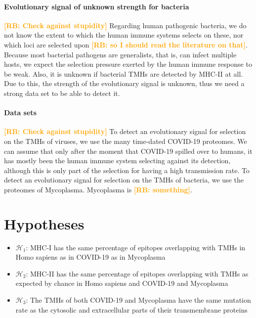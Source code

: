 \documentclass{article}
\newcommand{\richel}[1]{\textcolor{orange}{\textbf{[RB: #1]}}}
\begin{document}
\paragraph{Evolutionary signal of unknown strength for bacteria}

\richel{Check against stupidity}
Regarding human pathogenic bacteria, we do not know the extent to which the 
human immune systems selects on these, nor which loci are selected
upon \richel{so I should read the literature on that}.
Because most bacterial pathogens are generalists, that is,
can infect multiple hosts, we expect the selection pressure exerted
by the human immune response to be weak.
Also, it is unknown if bacterial TMHs are detected by MHC-II at all.
Due to this, the strength of the evolutionary signal is unknown,
thus we need a strong data set to be able to detect it.

\paragraph{Data sets}

\richel{Check against stupidity}
To detect an evolutionary signal for selection on the TMHs of viruses, 
we use the many time-dated COVID-19 proteomes.
We can assume that only after the moment that COVID-19 spilled over 
to humans, it has mostly been the human immune system selecting against
its detection, although this is only part of the selection for 
having a high transmission rate.
To detect an evolutionary signal for selection on the TMHs of bacteria, 
we use the proteomes of Mycoplasma. Mycoplasma is \richel{something}.


\section{Hypotheses}

\begin{itemize}
  \item $\mathcal{H}_1$: MHC-I has the same percentage of epitopes overlapping
    with TMHs in Homo sapiens as in COVID-19 as in Mycoplasma
  \item $\mathcal{H}_2$: MHC-II has the same percentage of epitopes overlapping
    with TMHs as expected by chance in Homo sapiens and COVID-19 and Mycoplasma
  \item $\mathcal{H}_3$: The TMHs of both COVID-19 and Mycoplasma
    have the same mutation rate 
    as the cytosolic and extracellular parts of their transmembrane proteins
\end{itemize}
\end{document}
